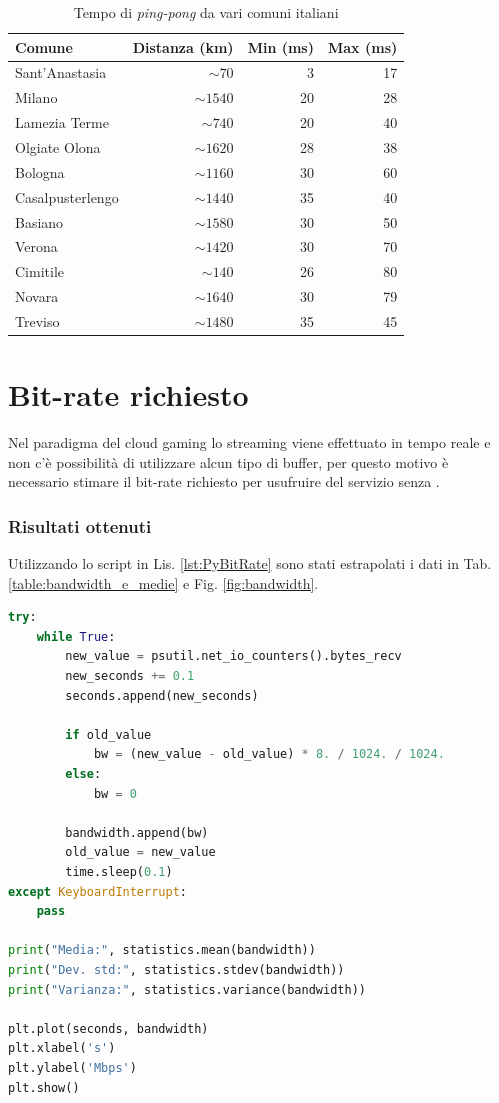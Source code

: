 \begin{table}[H]
	\centering
	\begin{tabular}{||l r r r||}
		\hline
		Comune & Distanza (km) & Min (ms) & Max (ms) \\
		\hline\hline
		\hline
		Sant'Anastasia & $\sim70$ & 3 & 17 \\
		\hline		
		Milano & $\sim1540$ & 20 & 28 \\
		\hline
		Lamezia Terme & $\sim740$ & 20 & 40 \\		
		\hline
		Olgiate Olona & $\sim1620$ & 28 & 38 \\
		\hline
		Bologna & $\sim1160$ & 30 & 60 \\
		\hline
		Casalpusterlengo & $\sim1440$ & 35 & 40 \\
		\hline
		Basiano & $\sim1580$ & 30 & 50 \\
		\hline
		Verona & $\sim1420$ & 30 & 70 \\
		\hline
		Cimitile & $\sim140$ & 26 & 80 \\
		\hline
		Novara & $\sim1640$ & 30 & 79 \\
		\hline		
		Treviso & $\sim1480$ & 35 & 45 \\
		\hline		
	\end{tabular}

	\caption{Tempo di \textit{ping-pong} da vari comuni italiani}
	\label{table:PingPong}
\end{table}




\section{Bit-rate richiesto}
Nel paradigma del cloud gaming lo streaming viene effettuato in tempo reale e non c'è possibilità di utilizzare alcun tipo di buffer, per questo motivo è necessario stimare il bit-rate richiesto per usufruire del servizio senza \parencite{ChenKuanTa2014OtQo}.

\subsubsection{Risultati ottenuti}
Utilizzando lo script in Lis. \ref{lst:PyBitRate} sono stati estrapolati i dati in Tab. \ref{table:bandwidth_e_medie} e Fig. \ref{fig:bandwidth}.

\begin{lstlisting}[language=Python, caption=Script Python per il calcolo del bit-rate richiesto, label={lst:PyBitRate}]
try:
	while True:
		new_value = psutil.net_io_counters().bytes_recv
		new_seconds += 0.1
		seconds.append(new_seconds)

		if old_value
			bw = (new_value - old_value) * 8. / 1024. / 1024.
		else:
			bw = 0

		bandwidth.append(bw)
		old_value = new_value
		time.sleep(0.1)
except KeyboardInterrupt:
	pass

print("Media:", statistics.mean(bandwidth))
print("Dev. std:", statistics.stdev(bandwidth))
print("Varianza:", statistics.variance(bandwidth))

plt.plot(seconds, bandwidth)
plt.xlabel('s')
plt.ylabel('Mbps')
plt.show()
\end{lstlisting}


